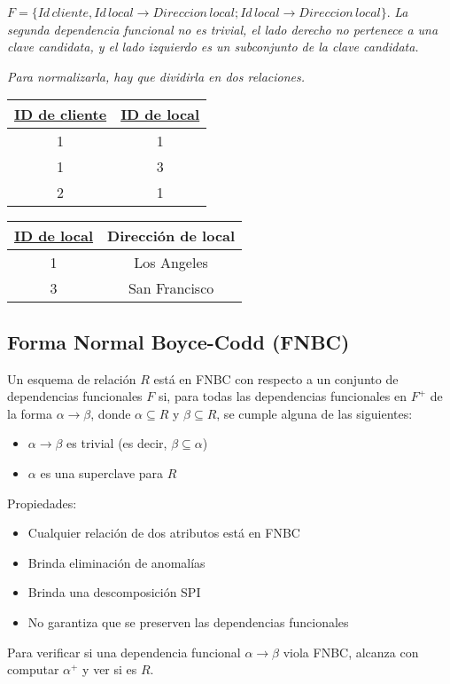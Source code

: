 \documentclass[a4paper, twoside]{article}
\begin{document}
$F=\{Id\, cliente,Id\, local\to Direccion\, local;Id\, local\to Direccion\, local\}$.
\emph{La segunda dependencia funcional no es trivial, el lado derecho
no pertenece a una clave candidata, y el lado izquierdo es un subconjunto
de la clave candidata.}

\emph{Para normalizarla, hay que dividirla en dos relaciones.}

\begin{tabular}{|c|c|}
\hline 
\uline{ID de cliente} & \uline{ID de local}\\
\hline 
\hline 
1 & 1\\
\hline 
1 & 3\\
\hline 
2 & 1\\
\hline 
\end{tabular}

\begin{tabular}{|c|c|}
\hline 
\uline{ID de local} & Dirección de local\\
\hline 
\hline 
1 & Los Angeles\\
\hline 
3 & San Francisco\\
\hline 
\end{tabular}


\subsection{Forma Normal Boyce-Codd (FNBC)}

Un esquema de relación $R$ está en FNBC con respecto a un conjunto
de dependencias funcionales $F$ si, para todas las dependencias funcionales
en $F^{+}$ de la forma $\alpha\to\beta$, donde $\alpha\subseteq R$
y $\beta\subseteq R$, se cumple alguna de las siguientes:
\begin{itemize}
\item $\alpha\to\beta$ es trivial (es decir, $\beta\subseteq\alpha$)
\item $\alpha$ es una superclave para $R$ 
\end{itemize}
Propiedades:
\begin{itemize}
\item Cualquier relación de dos atributos está en FNBC
\item Brinda eliminación de anomalías
\item Brinda una descomposición SPI
\item No garantiza que se preserven las dependencias funcionales
\end{itemize}
Para verificar si una dependencia funcional $\alpha\to\beta$ viola
FNBC, alcanza con computar $\alpha^{+}$ y ver si es $R$.
\end{document}
